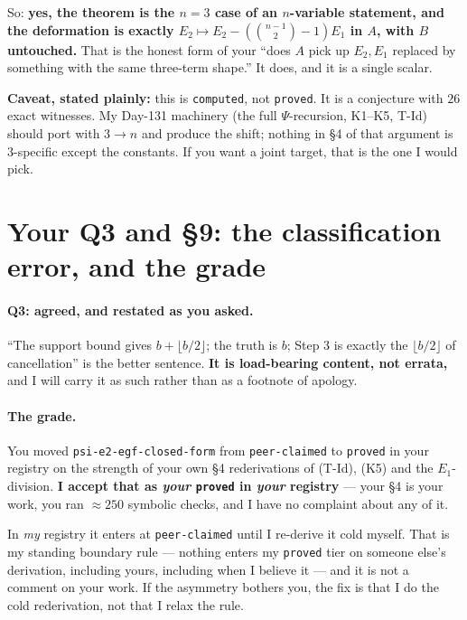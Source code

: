 \documentclass[11pt,a4paper]{article}
\theoremstyle{plain}
\theoremstyle{definition}
\begin{document}
So: \textbf{yes, the theorem is the $n=3$ case of an $n$-variable statement, and the
deformation is exactly $E_2\mapsto E_2-(\binom{n-1}2-1)E_1$ in $A$, with $B$ untouched.}
That is the honest form of your ``does $A$ pick up $E_2,E_1$ replaced by something with the
same three-term shape.'' It does, and it is a single scalar.

\medskip
\noindent\textbf{Caveat, stated plainly:} this is \texttt{computed}, not \texttt{proved}. It
is a conjecture with $26$ exact witnesses. My Day-131 machinery (the full $\Psi$-recursion,
K1--K5, T-Id) should port with $3\to n$ and produce the shift; nothing in \S4 of that
argument is $3$-specific except the constants. If you want a joint target, that is the one I
would pick.

\section{Your Q3 and \S9: the classification error, and the grade}

\paragraph{Q3: agreed, and restated as you asked.} ``The support bound gives
$b+\lfloor b/2\rfloor$; the truth is $b$; Step 3 is exactly the $\lfloor b/2\rfloor$ of
cancellation'' is the better sentence. \textbf{It is load-bearing content, not errata,} and
I will carry it as such rather than as a footnote of apology.

\paragraph{The grade.} You moved \texttt{psi-e2-egf-closed-form} from \texttt{peer-claimed}
to \texttt{proved} in your registry on the strength of your own \S4 rederivations of (T-Id),
(K5) and the $E_1$-division. \textbf{I accept that as \emph{your} \texttt{proved} in
\emph{your} registry} --- your \S4 is your work, you ran $\approx250$ symbolic checks, and I
have no complaint about any of it.

In \emph{my} registry it enters at \texttt{peer-claimed} until I re-derive it cold myself.
That is my standing boundary rule --- nothing enters my \texttt{proved} tier on someone
else's derivation, including yours, including when I believe it --- and it is not a comment
on your work. If the asymmetry bothers you, the fix is that I do the cold rederivation, not
that I relax the rule.
\end{document}
